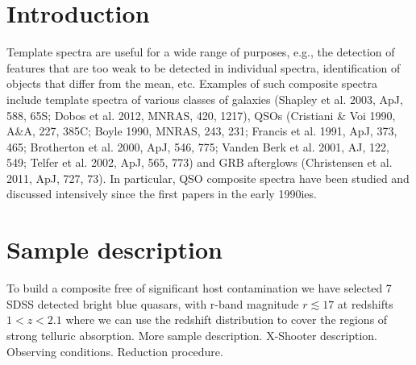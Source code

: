 \documentclass[iop]{emulateapj}
\begin{document}


\section{Introduction}

Template spectra are useful for a wide range of purposes, e.g., the detection of features that are too weak to be detected in individual spectra, identification of objects that differ from the mean, etc. Examples of such composite spectra include template spectra of various classes of galaxies (Shapley et al. 2003, ApJ, 588, 65S; Dobos et al. 2012, MNRAS, 420, 1217), QSOs (Cristiani \& Voi 1990, A\&A, 227, 385C; Boyle 1990, MNRAS, 243, 231; Francis et al. 1991, ApJ, 373, 465; Brotherton et al. 2000, ApJ, 546, 775; Vanden Berk et al. 2001, AJ, 122, 549; Telfer et al. 2002, ApJ, 565, 773) and GRB afterglows (Christensen et al. 2011, ApJ, 727, 73). In particular, QSO composite spectra have been studied and discussed intensively since the first papers in the early 1990ies.

\newpage



\section{Sample description}
To build a composite free of significant host contamination we have selected 7 SDSS detected bright blue quasars, with r-band magnitude $r \lesssim 17$ at redshifts $1 < z < 2.1$ where we can use the redshift distribution to cover the regions of strong telluric absorption. More sample description. X-Shooter description. Observing conditions. Reduction procedure. 




\newcommand\sk[2]{Sk\,{$-#1{^\circ}#2$}}
\newcommand\tnc{\,\tablenotemark{c}}
\newcommand\tnd{\,\tablenotemark{d}}
\end{document}
